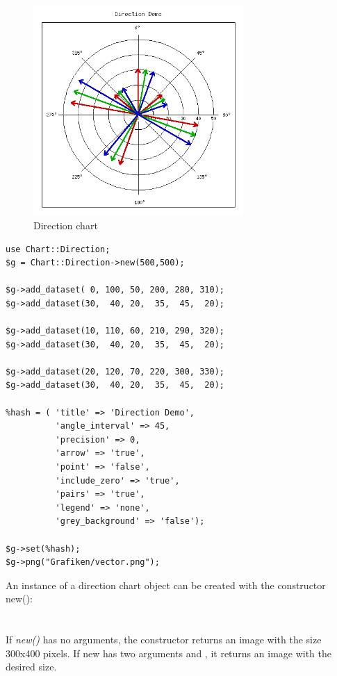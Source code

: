 \begin{figure}[h]
	\begin{center}
		\includegraphics[width = 8cm, height =8cm]{direction.png}
	\end{center}
	\caption{Direction chart}
	\label{fig:direction}
\end{figure}
\begin{verbatim}
use Chart::Direction;
$g = Chart::Direction->new(500,500);

$g->add_dataset( 0, 100, 50, 200, 280, 310);
$g->add_dataset(30,  40, 20,  35,  45,  20);

$g->add_dataset(10, 110, 60, 210, 290, 320);
$g->add_dataset(30,  40, 20,  35,  45,  20);

$g->add_dataset(20, 120, 70, 220, 300, 330);
$g->add_dataset(30,  40, 20,  35,  45,  20);

%hash = ( 'title' => 'Direction Demo',
          'angle_interval' => 45,
          'precision' => 0,
          'arrow' => 'true',
          'point' => 'false',
          'include_zero' => 'true',
          'pairs' => 'true',
          'legend' => 'none',
          'grey_background' => 'false');
      
$g->set(%hash);
$g->png("Grafiken/vector.png");
\end{verbatim}


\begin{Constructor} 
An instance of a direction chart object can be created with the constructor new():\\
\\
\\
If \textit{new()} has no arguments, 
the constructor returns an image with the size 300x400 pixels. 
If new has two arguments  and , 
it returns an image with the desired size. \\ 
\end{Constructor}

